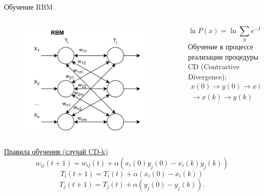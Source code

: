 \documentclass[10pt]{beamer}
\begin{document}
        \begin{frame}{Обучение RBM}
            \begin{columns}
                \begin{column}{0.4\textwidth}
                    \begin{figure}[H]
                        \centering
                        \includegraphics[width=0.9\textwidth]{pic4.png}
                        \label{fig:pic1_2}
                    \end{figure}
                \end{column}
                \begin{column}{0.6\textwidth}
                    \begin{equation*}
	                   \ln P(x)=\ln \sum_y e^{-E(x,y)}-\ln \sum_{x,y} e^{-E(x,y)}
                    \end{equation*}
                    Обучение в процессе реализации процедуры CD (Contrastive Divergence):
                    \begin{multline*}
	                   x(0) \rightarrow y(0) \rightarrow x(1) \rightarrow y(1) \rightarrow \ldots \\ \rightarrow x(k) \rightarrow y(k)
                    \end{multline*}
                \end{column}
            \end{columns}
            \underline{Правила обучения (случай CD-k)}
            \begin{equation*}
		    w_{ij}(t+1)=w_{ij}(t)+\alpha(x_i(0)y_j(0)-x_i(k)y_j(k))
            \end{equation*}
            \begin{equation*}		
		        T_i(t+1)=T_i(t)+\alpha(x_i(0)-x_i(k))
            \end{equation*}
            \begin{equation*}		
		        T_j(t+1)=T_j(t)+\alpha(y_j(0)-y_j(k)).
            \end{equation*}	
        \end{frame}
\end{document}
